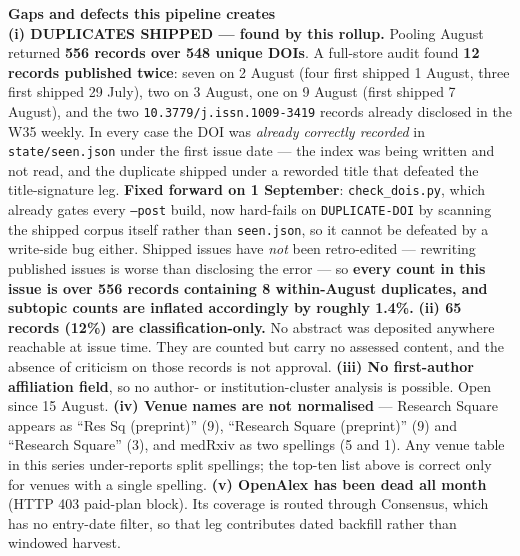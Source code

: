 \documentclass[10pt]{article}
\begin{document}
\vspace{2.5mm}

\begin{keybox}
{\sffamily\bfseries\footnotesize\color{Deep}Gaps and defects this pipeline creates}\\[1.2mm]
\footnotesize
\textbf{(i) DUPLICATES SHIPPED --- found by this rollup.} Pooling August returned
\textbf{556 records over 548 unique DOIs}. A full-store audit found \textbf{12 records
published twice}: seven on 2 August (four first shipped 1 August, three first shipped
29 July), two on 3 August, one on 9 August (first shipped 7 August), and the two
\texttt{10.3779/j.issn.1009-3419} records already disclosed in the W35 weekly. In every
case the DOI was \emph{already correctly recorded} in \texttt{state/seen.json} under the
first issue date --- the index was being written and not read, and the duplicate shipped
under a reworded title that defeated the title-signature leg. \textbf{Fixed forward on
1 September}: \texttt{check\_dois.py}, which already gates every \texttt{--post} build,
now hard-fails on \texttt{DUPLICATE-DOI} by scanning the shipped corpus itself rather
than \texttt{seen.json}, so it cannot be defeated by a write-side bug either. Shipped
issues have \emph{not} been retro-edited --- rewriting published issues is worse than
disclosing the error --- so \textbf{every count in this issue is over 556 records
containing 8 within-August duplicates, and subtopic counts are inflated accordingly by
roughly 1.4\%.}
\textbf{(ii) 65 records (12\%) are classification-only.} No abstract was deposited
anywhere reachable at issue time. They are counted but carry no assessed content, and the
absence of criticism on those records is not approval.
\textbf{(iii) No first-author affiliation field}, so no author- or institution-cluster
analysis is possible. Open since 15 August.
\textbf{(iv) Venue names are not normalised} --- Research Square appears as ``Res Sq
(preprint)'' (9), ``Research Square (preprint)'' (9) and ``Research Square'' (3), and
medRxiv as two spellings (5 and 1). Any venue table in this series under-reports split
spellings; the top-ten list above is correct only for venues with a single spelling.
\textbf{(v) OpenAlex has been dead all month} (HTTP 403 paid-plan block). Its coverage is
routed through Consensus, which has no entry-date filter, so that leg contributes dated
backfill rather than windowed harvest.
\end{keybox}

\vspace{3mm}
\end{document}
